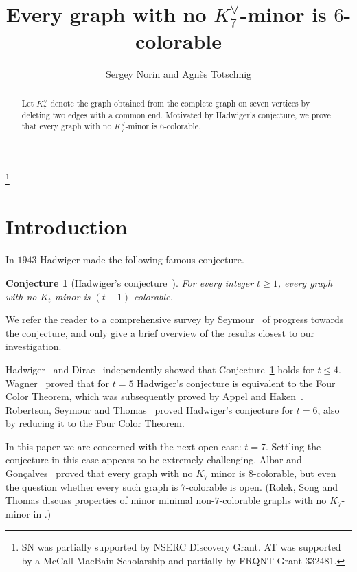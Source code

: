 \documentclass[reqno,final,12pt]{amsart}
\newtheorem{conj}[thm]{Conjecture}
\begin{document}
	
	\title{Every  graph with no $K_7^{\vee}$-minor is $6$-colorable}
	
	\author{
		Sergey Norin	
		and Agn\`es Totschnig}
	\address{Department of Mathematics and Statistics, McGill University, Montr\'{e}al, QC, Canada.}
	\thanks{SN was partially supported by NSERC Discovery Grant. AT was supported by a McCall MacBain Scholarship and partially by FRQNT Grant 332481.
	}
	
\begin{abstract} 
	Let  $K_7^{\vee}$ denote the graph obtained from the complete graph on seven vertices by deleting two edges with a common end. Motivated by Hadwiger's conjecture, we prove that every  graph with no $K_7^{\vee}$-minor is $6$-colorable.
\end{abstract}
	\maketitle
	\section{Introduction}
	
	In $1943$ Hadwiger made the following famous conjecture.
	
	\begin{conj}[Hadwiger's conjecture~\cite{Hadwiger1943}]\label{Hadwiger} For every integer $t \geq 1$, every graph with no $K_{t}$ minor is $(t-1)$-colorable. 
	\end{conj}
	
	We refer the reader to a comprehensive survey by Seymour~\cite{Seymour2016} of progress towards the conjecture, and only give a brief overview of the results closest to our investigation. 
	
	Hadwiger~\cite{Hadwiger1943} and Dirac~\cite{Dirac1952} independently showed that Conjecture~\ref{Hadwiger} holds for $t \leq 4$. Wagner~\cite{Wagner1937} proved that for $t=5$  Hadwiger's  conjecture is equivalent to the Four Color Theorem, which was subsequently proved by Appel and Haken~\cite{AH1977,AHK1977}. 
	Robertson, Seymour and  Thomas~\cite{RST1993} proved Hadwiger's conjecture for $t=6$, also by reducing it to the Four Color Theorem. 
	
	In this paper we are concerned with the next open case: $t=7$. 
	Settling the conjecture in this case appears to be extremely challenging. Albar and Gon\c{c}alves~\cite{AG2018} proved that every graph with no $K_7$ minor is $8$-colorable, but even the question whether every such graph is $7$-colorable is open. (Rolek, Song and  Thomas discuss properties of minor minimal non-$7$-colorable graphs with no $K_7$-minor in \cite{RST2023}.)
	
\end{document}
